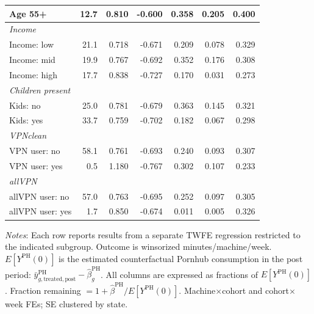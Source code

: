 \begin{landscape}
\begin{table}[htbp]
\begin{tabular}{lrr rrrr}
Age 55+ & 12.7 & 0.810 & -0.600 & 0.358 & 0.205 & 0.400 \\
\midrule
\multicolumn{7}{l}{\textit{Income}} \\
Income: low & 21.1 & 0.718 & -0.671 & 0.209 & 0.078 & 0.329 \\
Income: mid & 19.9 & 0.767 & -0.692 & 0.352 & 0.176 & 0.308 \\
Income: high & 17.7 & 0.838 & -0.727 & 0.170 & 0.031 & 0.273 \\
\midrule
\multicolumn{7}{l}{\textit{Children present}} \\
Kids: no & 25.0 & 0.781 & -0.679 & 0.363 & 0.145 & 0.321 \\
Kids: yes & 33.7 & 0.759 & -0.702 & 0.182 & 0.067 & 0.298 \\
\midrule
\multicolumn{7}{l}{\textit{VPNclean}} \\
VPN user: no & 58.1 & 0.761 & -0.693 & 0.240 & 0.093 & 0.307 \\
VPN user: yes & 0.5 & 1.180 & -0.767 & 0.302 & 0.107 & 0.233 \\
\midrule
\multicolumn{7}{l}{\textit{allVPN}} \\
allVPN user: no & 57.0 & 0.763 & -0.695 & 0.252 & 0.097 & 0.305 \\
allVPN user: yes & 1.7 & 0.850 & -0.674 & 0.011 & 0.005 & 0.326 \\
\bottomrule
\end{tabular}
\vspace{4pt}
\begin{minipage}{\linewidth}\footnotesize
\textit{Notes}: Each row reports results from a separate TWFE regression restricted to the indicated subgroup. Outcome is winsorized minutes/machine/week. $E[Y^{\text{PH}}(0)]$ is the estimated counterfactual Pornhub consumption in the post period: $\bar{y}^{\text{PH}}_{g,\text{treated},\text{post}} - \hat{\beta}^{\text{PH}}_g$. All columns are expressed as fractions of $E[Y^{\text{PH}}(0)]$. Fraction remaining $= 1 + \hat{\beta}^{\text{PH}}/E[Y^{\text{PH}}(0)]$. Machine$\times$cohort and cohort$\times$week FEs; SE clustered by state.
\end{minipage}
\end{table}
\end{landscape}
